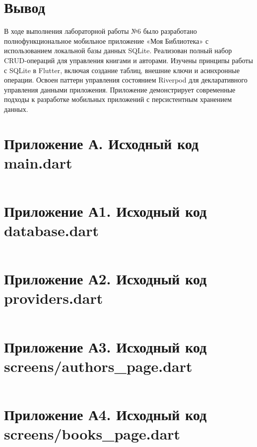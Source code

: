 \documentclass[oneside,a4paper,14pt]{extarticle}
\begin{document}
\section*{Вывод}

В ходе выполнения лабораторной работы №6 было разработано полнофункциональное мобильное приложение «Моя Библиотека» с использованием локальной базы данных SQLite.  
Реализован полный набор CRUD-операций для управления книгами и авторами.  
Изучены принципы работы с SQLite в Flutter, включая создание таблиц, внешние ключи и асинхронные операции.  
Освоен паттерн управления состоянием Riverpod для декларативного управления данными приложения.  
Приложение демонстрирует современные подходы к разработке мобильных приложений с персистентным хранением данных.

\newpage

\section*{Приложение А. Исходный код main.dart}
\inputminted{dart}{code/lib/main.dart}

\newpage

\section*{Приложение А1. Исходный код database.dart}
\inputminted{dart}{code/lib/database.dart}

\newpage

\section*{Приложение А2. Исходный код providers.dart}
\inputminted{dart}{code/lib/providers.dart}

\newpage

\section*{Приложение А3. Исходный код screens/authors\_page.dart}
\inputminted{dart}{code/lib/screens/authors_page.dart}

\newpage

\section*{Приложение А4. Исходный код screens/books\_page.dart}
\inputminted{dart}{code/lib/screens/books_page.dart}

\newpage
\end{document}
